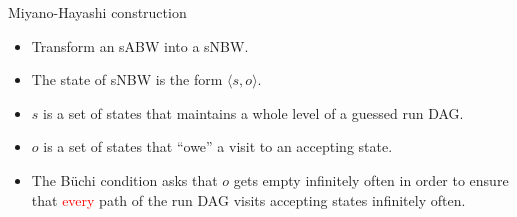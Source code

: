 \documentclass[12pt]{beamer}
\begin{document}
\begin{frame}{Miyano-Hayashi construction}
	\begin{itemize}
		\item Transform an sABW into a sNBW.
		\item The state of sNBW is the form $\langle s, o \rangle$.
		\item $s$ is a set of states that maintains a whole level of a guessed run DAG.
		\item $o$ is a set of states that ``owe'' a visit to an accepting state.
		\item  The Büchi condition asks that $o$ gets empty infinitely often in order to ensure that \textcolor{red}{every} path of the run DAG visits accepting states infinitely often.
	\end{itemize}
\end{frame}
\end{document}
